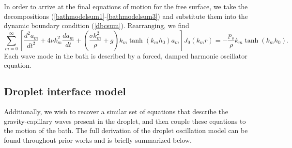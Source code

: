 \documentclass{jfm}
\begin{document}
\hspace*{1em} In order to arrive at the final equations of motion for the free surface, we take the decompositions (\ref{bathmodelsum1}-\ref{bathmodelsum3}) and substitute them into the dynamic boundary condition (\ref{dbcsum}).
Rearranging, we find 
\begin{equation}
    \sum_{m=0}^{\infty} \left [ \frac{d^2 a_m}{dt^2} + 4 \nu k_m^2 \frac{da_m}{dt} + \left(\frac{\sigma k_m^2}{\rho} + g\right)k_m\tanh{(k_m h_0)}a_m \right ] J_0(k_mr) = -\frac{p_s}{\rho}k_m\tanh{(k_m h_0)} \text{.}
    \label{bathmodeswithP}
\end{equation}
Each wave mode in the bath is described by a forced, damped harmonic oscillator equation.
\subsection{Droplet interface model}
Additionally, we wish to recover a similar set of equations that describe the gravity-capillary waves present in the droplet, and then couple these equations to the motion of the bath.  The full derivation of the droplet oscillation model can be found throughout prior works \citep{lamb1924hydrodynamics,tsamopoulos1983nonlinear,courty2006oscillating,chevy2012liquid,balla2019shape} and is briefly summarized below.
\end{document}
